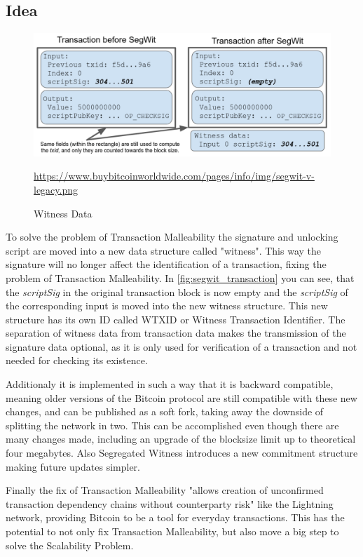 \subsection{Idea}
\label{sec:SegWit:Idea}
\begin{figure}[!ht]
    \centering
    \includegraphics[width=(\textwidth * 2 / 3 )]{Ausarbeitung/images/SegWitTransactionChanges.png}
    \caption[Witness Data]{Witness Data}
    \small \url{https://www.buybitcoinworldwide.com/pages/info/img/segwit-v-legacy.png} 
    \label{fig:segwit_transaction}
\end{figure}
To solve the problem of Transaction Malleability the signature and unlocking script are moved into a new data structure called "witness". This way the signature will no longer affect the identification of a transaction, fixing the problem of Transaction Malleability. In \autoref{fig:segwit_transaction} you can see, that the \textit{scriptSig} in the original transaction block is now empty and the \textit{scriptSig} of the corresponding input is moved into the new witness structure. This new structure has its own ID called WTXID or Witness Transaction Identifier. The separation of witness data from transaction data makes the transmission of the signature data optional, as it is only used for verification of a transaction and not needed for checking its existence.

Additionaly it is implemented in such a way that it is backward compatible, meaning older versions of the Bitcoin protocol are still compatible with these new changes, and can be published as a soft fork, taking away the downside of splitting the network in two. This can be accomplished even though there are many changes made, including an upgrade of the blocksize limit up to theoretical four megabytes. Also Segregated Witness introduces a new commitment structure making future updates simpler.

Finally the fix of Transaction Malleability "allows creation of unconfirmed transaction dependency chains without counterparty risk" \cite{bip-141} like the Lightning network, providing Bitcoin to be a tool for everyday transactions. This has the potential to not only fix Transaction Malleability, but also move a big step to solve the Scalability Problem.


